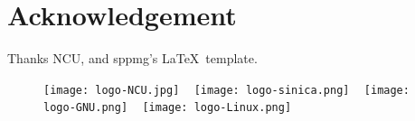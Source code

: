 \documentclass[class=NCU_thesis, crop=false]{standalone}
\begin{document}
\chapter{Acknowledgement}

Thanks NCU, and sppmg\textquoteright{}s \LaTeX\ template\cite{_sppmg/tw_thesis_template_????}.

\begin{figure}[!hbt]
    \captionsetup[subfigure]{labelformat=empty}
    \centering
    \subcaptionbox
        {}
        {\texttt{[image: logo-NCU.jpg]}}
    ~
    \subcaptionbox
        {}
        {\texttt{[image: logo-sinica.png]}}
    ~
    \subcaptionbox
        {}
        {\texttt{[image: logo-GNU.png]}}
    ~
    \subcaptionbox
        {}
        {\texttt{[image: logo-Linux.png]}}
\end{figure}
\end{document}
